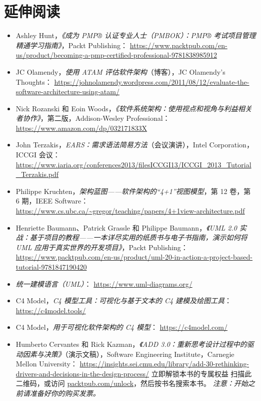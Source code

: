 \section{延伸阅读}

\begin{itemize}
\item Ashley Hunt，\emph{《成为 PMP® 认证专业人士（PMBOK）：PMP® 考试项目管理精通学习指南》}，Packt Publishing： \href{https://www.packtpub.com/en-us/product/becoming-a-pmp-certified-professional-9781838985912}{https://www.packtpub.com/en-us/product/becoming-a-pmp-certified-professional-9781838985912}
\item JC Olamendy，\emph{使用 ATAM 评估软件架构}（博客），JC Olamendy's Thoughts： \href{https://johnolamendy.wordpress.com/2011/08/12/evaluate-the-software-architecture-using-atam/ }{https://johnolamendy.wordpress.com/2011/08/12/evaluate-the-software-architecture-using-atam/}
\item Nick Rozanski 和 Eoin Woods，\emph{《软件系统架构：使用视点和视角与利益相关者协作》}，第二版，Addison-Wesley Professional： \href{https://www.amazon.com/dp/032171833X}{https://www.amazon.com/dp/032171833X}
\item John Terzakis，\emph{EARS：需求语法简易方法}（会议演讲），Intel Corporation，ICCGI 会议： \href{https://www.iaria.org/conferences2013/filesICCGI13/ICCGI_2013_Tutorial_Terzakis.pdf}{https://www.iaria.org/conferences2013/filesICCGI13/ICCGI\_2013\_Tutorial\_Terzakis.pdf}
\item Philippe Kruchten，\emph{架构蓝图——软件架构的“4+1”视图模型}，第 12 卷，第 6 期，IEEE Software： \href{https://www.cs.ubc.ca/\string~gregor/teaching/papers/4+1view-architecture.pdf}{https://www.cs.ubc.ca/\textasciitilde{}gregor/teaching/papers/4+1view-architecture.pdf}
\item Henriette Baumann、Patrick Grassle 和 Philippe Baumann，\emph{《UML 2.0 实战：基于项目的教程——一本详尽实用的纸质书与电子书指南，演示如何将 UML 应用于真实世界的开发项目》}，Packt Publishing： \href{https://www.packtpub.com/en-us/product/uml-20-in-action-a-project-based-tutorial-9781847190420}{https://www.packtpub.com/en-us/product/uml-20-in-action-a-project-based-tutorial-9781847190420}
\item \emph{统一建模语言（UML）}： \href{https://www.uml-diagrams.org/}{https://www.uml-diagrams.org/}
\item C4 Model，\emph{C4 模型工具：可视化与基于文本的 C4 建模及绘图工具}： \href{https://c4model.tools/ }{https://c4model.tools/}
\item C4 Model，\emph{用于可视化软件架构的 C4 模型}： \href{https://c4model.com/}{https://c4model.com/}
\item Humberto Cervantes 和 Rick Kazman，\emph{《ADD 3.0：重新思考设计过程中的驱动因素与决策》}（演示文稿），Software Engineering Institute，Carnegie Mellon University： \href{https://insights.sei.cmu.edu/library/add-30-rethinking-drivers-and-decisions-in-the-design-process/}{https://insights.sei.cmu.edu/library/add-30-rethinking-drivers-and-decisions-in-the-design-process/} 立即解锁本书的专属权益 扫描此二维码，或访问 \href{http://packtpub.com/unlock}{packtpub.com/unlock}，然后按书名搜索本书。 \emph{注意：开始之前请准备好你的购买发票。}
\end{itemize}
